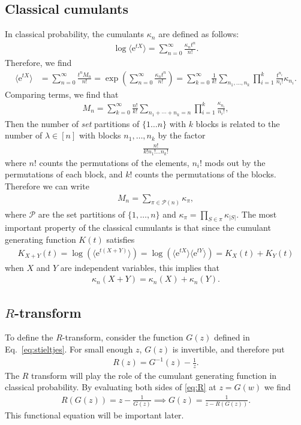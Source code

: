 \documentclass[11pt]{article}
\newcommand{\e}{\mathrm e}
\theoremstyle{definition}
\begin{document}
\subsection{Classical cumulants}
In classical probability, the cumulants $\kappa_n$ are defined as follows:
\begin{align}
\log \langle \e^{tX} \rangle = \sum_{n=0}^\infty \frac{\kappa_n t^n}{n!}.
\end{align}
Therefore, we find
\begin{align}
\langle \e^{t X}\rangle &= \sum_{n=0}^\infty \frac{t^nM_n}{n!} = \exp(\sum_{n=0}^\infty \frac{\kappa_n t^n}{n!}) = \sum_{k = 0}^{\infty}\frac{1}{k!}\sum_{n_1, \ldots, n_k}\prod_{i=1}^k \frac{t^{n_i}}{n_i!}\kappa_{n_i}.
\end{align}
Comparing terms, we find that
\begin{align}
M_n = \sum_{k=0}^{\infty}\frac{n!}{k!}\sum_{n_1 + \cdots + n_k = n}\prod_{i=1}^k \frac{\kappa_{n_i}}{n_i!},
\end{align}
Then the number of \emph{set} partitions of $\{1 \ldots n\}$ with $k$ blocks is related to the number of $\lambda \in [n]$ with blocks $n_1, \ldots, n_k$ by the factor
\begin{align}
\frac{n!}{k!n_1! \ldots n_k!}
\end{align}
where $n!$ counts the permutations of the elements, $n_i!$ mods out by the permutations of each block, and $k!$ counts the permutations of the blocks. Therefore we can write
\begin{align}
M_n = \sum_{\pi \in \mathcal P(n)}\kappa_{\pi},
\end{align}
where $\mathcal P$ are the set partitions of $\{1, \ldots, n\}$ and $\kappa_{\pi} = \prod_{S \in \pi}\kappa_{|S|}$. 
The most important property of the classical cumulants is that since 
 the cumulant generating function $K(t)$ satisfies
\begin{align}
K_{X+Y}(t) = \log(\langle \e^{t(X+Y)}\rangle)  =\log(\langle \e^{tX}\rangle \langle \e^{tY}\rangle) = K_X(t) + K_Y(t)
\end{align}
when $X$ and $Y$ are independent variables, this implies that
\begin{align}
\kappa_n(X + Y) = \kappa_n(X) + \kappa_n(Y).
\end{align}

\subsection{$R$-transform}
To define the $R$-transform, consider the function $G(z)$ defined in Eq.~\eqref{eq:stieltjes}. For small enough $z$, $G(z)$ is invertible, and therefore put 
\begin{align}
R(z) = G^{-1}(z) - \frac{1}{z}.\label{eq:R}
\end{align}
The $R$ transform will play the role of the cumulant generating function in classical probability. 
By evaluating both sides of \eqref{eq:R} at $z = G(w)$ we find
\begin{align}
R(G(z)) = z - \frac{1}{G(z)} \implies G(z) = \frac{1}{z-R(G(z))}. \label{eq:GR}
\end{align}
This functional equation will be important later.
\end{document}
